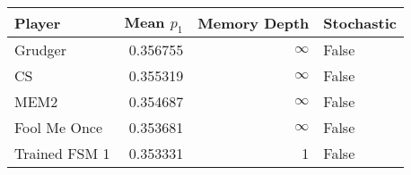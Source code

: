 \begin{tabular}{lrrl}
\toprule
        Player &  Mean $p_1$ &  Memory Depth & Stochastic \\
\midrule
       Grudger &    0.356755 &            \(\infty\) &      False \\
            CS &    0.355319 &            \(\infty\) &      False \\
          MEM2 &    0.354687 &            \(\infty\) &      False \\
  Fool Me Once &    0.353681 &            \(\infty\) &      False \\
 Trained FSM 1 &    0.353331 &             1 &      False \\
\bottomrule
\end{tabular}
